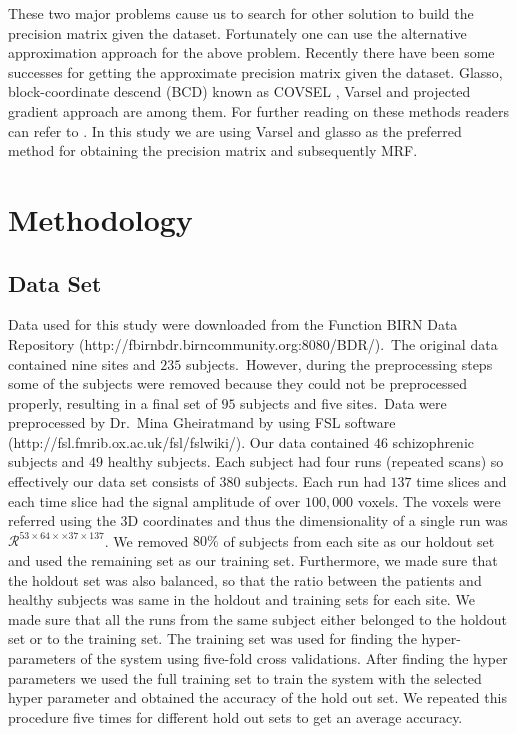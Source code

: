 \documentclass{article} %
\begin{document}
These two major problems cause us to search for other solution to build the 
precision matrix given the dataset. Fortunately one can use the alternative 
approximation approach for the above problem. Recently there have been some 
successes for getting the approximate precision matrix given the dataset. 
Glasso\cite{glasso}, block-coordinate descend (BCD) known as COVSEL \cite{Banerjee:2008:MST:1390681.1390696}, Varsel \cite{honorio2009sparse} and projected gradient \cite{lin2009learning} 
approach are among them. For further reading on these methods readers can 
refer to \cite{Rish2014Book}. In this study we are using Varsel and glasso as 
the preferred method for obtaining the precision matrix and subsequently MRF.   


\section{Methodology}

\subsection{Data Set}
Data used for this study were downloaded from the Function BIRN Data 
Repository (http://fbirnbdr.birncommunity.org:8080/BDR/).\ The original 
data contained nine sites and $235$ subjects.\ However, during the 
preprocessing steps some of the subjects were removed because they could
not be preprocessed properly, resulting in a final set of $95$ 
subjects and five sites.\ Data were preprocessed by Dr.\ Mina Gheiratmand by 
using FSL software (http://fsl.fmrib.ox.ac.uk/fsl/fslwiki/). Our data 
contained $46$ schizophrenic subjects and $49$ healthy subjects. Each subject 
had four runs (repeated scans) so effectively our data set consists of $380$ subjects. Each run had 
$137$ time slices and each time slice had the signal amplitude of over 
$100,000$ voxels. The voxels were referred using the 3D coordinates and thus 
the dimensionality of a single run was 
$\mathcal R^{ 53 \times 64 \times \times 37 \times 137}$.
We removed $80\%$ of subjects from each site as our holdout set and used the 
remaining set as our training set. Furthermore, we made sure that the holdout 
set was also balanced, so that the ratio between the patients and healthy 
subjects was same in the holdout and training sets for each site. We made 
sure that all the runs from the same subject either belonged to the holdout 
set or to the training set. The training set was used for finding the 
hyper-parameters of the system using five-fold cross validations. After finding 
the hyper parameters we used the full training set to train the system with 
the selected hyper parameter and obtained the accuracy of the hold out set. 
We repeated this procedure five times for different hold out sets 
to get an average accuracy. 
\end{document}
